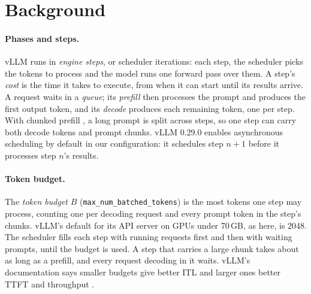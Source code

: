 \section{Background}
\label{sec:background}

\paragraph{Phases and steps.}
vLLM runs in \emph{engine steps}, or scheduler iterations: each step, the scheduler
picks the tokens to process and the model runs one forward pass over them. A step's
\emph{cost} is the time it takes to execute, from when it can start until its results
arrive. A request waits in a \emph{queue}; its \emph{prefill} then processes the
prompt and produces the first output token, and its \emph{decode} produces each
remaining token, one per step. With chunked prefill \citep{agrawal2024sarathiserve}, a
long prompt is split across steps, so one step can carry both decode tokens and prompt
chunks. vLLM 0.29.0 enables asynchronous scheduling by default in our configuration:
it schedules step $n{+}1$ before it processes step $n$'s results.

\paragraph{Token budget.}
The \emph{token budget} $B$ (\texttt{max\_num\_batched\_tokens}) is the most tokens one
step may process, counting one per decoding request and every prompt token in the
step's chunks. vLLM's default for its API server on GPUs under 70\,GB, as here, is
2048. The scheduler fills each step with running requests first and then with waiting
prompts, until the budget is used. A step that carries a large chunk takes about as
long as a prefill, and every request decoding in it waits. vLLM's documentation says
smaller budgets give better ITL and larger ones better TTFT and throughput
\citep{vllmdocsoptimization}.

